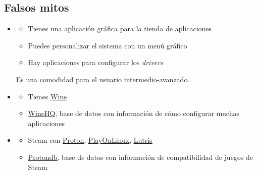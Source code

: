 \documentclass[aspectratio=43]{beamer}
\begin{document}
    \subsection{Falsos mitos}
    \begin{frame}[fragile]{\subsecname}{\secname}
        \begin{itemize}
            \item {}
            \pause
            \begin{itemize}
                \item Tienes una aplicación gráfica para la tienda de aplicaciones
                \item Puedes personalizar el sistema con un menú gráfico
                \item Hay aplicaciones para configurar los \textit{drivers}
            \end{itemize}
            Es una comodidad para el usuario intermedio-avanzado.
            \item {}
            \pause
            \begin{itemize}
                \item Tienes \href{https://www.winehq.org/}{\underline{Wine}}
                \item \href{https://appdb.winehq.org/}{\underline{WineHQ}}, base de datos con información de cómo configurar muchas aplicaciones
            \end{itemize}
            \item {}
            \pause
            \begin{itemize}
                \item Steam con \href{https://github.com/ValveSoftware/Proton}{\underline{Proton}}, \href{https://www.playonlinux.com/}{\underline{PlayOnLinux}}, \href{https://lutris.net/}{\underline{Lutris}}
                \item \href{https://www.protondb.com/}{\underline{Protondb}}, base de datos con información de compatibilidad de juegos de Steam
            \end{itemize}
        \end{itemize}
    \end{frame}

\end{document}
